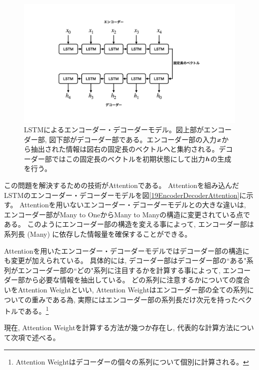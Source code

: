 \begin{figure}[htbp]
 \centering
 \includegraphics[trim = 100 100 100 200, width=1.0\textwidth, clip]{Figure/2DeepLearning/18EncoderDecoderLSTM.png}
 \caption[LSTMによるエンコーダー・デコーダーモデル]{LSTMによるエンコーダー・デコーダーモデル。図上部がエンコーダー部, 図下部がデコーダー部である。エンコーダー部の入力${\mbox{\boldmath{$x$}}}$から抽出された情報は図右の固定長のベクトルへと集約される。デコーダー部ではこの固定長のベクトルを初期状態にして出力${\mbox{\boldmath{$h$}}}$の生成を行う。}
 \label{18EncoderDecoderLSTM}
\end{figure}

この問題を解決するための技術がAttentionである。
Attentionを組み込んだLSTMのエンコーダー・デコーダーモデルを図\ref{19EncoderDecoderAttention}に示す。
Attentionを用いないエンコーダー・デコーダーモデルとの大きな違いは, エンコーダー部がMany to OneからMany to Manyの構造に変更されている点である。
このようにエンコーダー部の構造を変える事によって, エンコーダー部は系列長 (Many) に依存した情報量を確保することができる。

Attentionを用いたエンコーダー・デコーダーモデルではデコーダー部の構造にも変更が加えられている。
具体的には, デコーダー部はデコーダー部の``ある"系列がエンコーダー部の``どの"系列に注目するかを計算する事によって, エンコーダー部から必要な情報を抽出している。
どの系列に注意するかについての度合いをAttention Weightといい, Attention Weightはエンコーダー部の全ての系列についての重みである為, 実際にはエンコーダー部の系列長だけ次元を持ったベクトルである。\footnote{Attention Weightはデコーダーの個々の系列について個別に計算される。}

現在, Attention Weightを計算する方法が幾つか存在し, 代表的な計算方法について次項で述べる。

